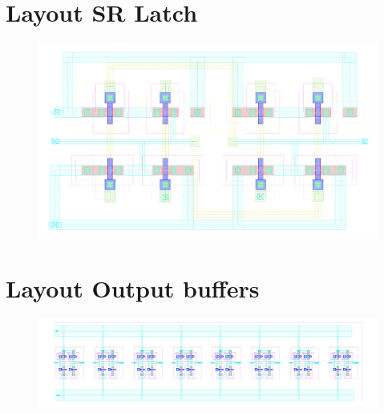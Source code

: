 \documentclass[english, 12pt, a4paper]{ifimaster}
\begin{document}
\begin{appendices}
\newpage
\section{Layout SR Latch}
\begin{figure}[!ht]
 \centering
 \includegraphics[width=20cm, angle=90]{img/layout/srlatch}
\end{figure}

\newpage
\section{Layout Output buffers}
\begin{figure}[!ht]
 \centering
 \includegraphics[width=20cm, angle=90]{img/layout/outputbuffer}
\end{figure}


\end{appendices}
\end{document}

